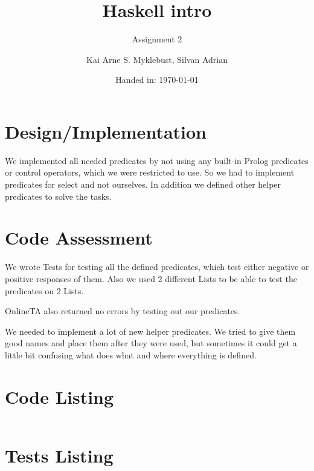 \documentclass[12pt,a4paper]{article}
\begin{document}
\title{Haskell intro}
\subtitle{Assignment 2}

\author{Kai Arne S. Myklebust, Silvan Adrian}
\date{Handed in: \today}
	
\maketitle
\tableofcontents

\section{Design/Implementation}

We implemented all needed predicates by not using any built-in Prolog predicates or control operators, which we were restricted to use.
So we had to implement predicates for select and not ourselves. In addition we defined other helper predicates to solve the tasks.

\section{Code Assessment}
We wrote Tests for testing all the defined predicates, which test either negative or positive responses of them.
Also we used 2 different Lists to be able to test the predicates on 2 Lists.

OnlineTA also returned no errors by testing out our predicates.

We needed to implement a lot of new helper predicates. We tried to give them good names and place them after they were used, but sometimes it could get a little bit confusing what does what and where everything is defined.

\appendix
\section{Code Listing}
\inputminted{prolog}{handin/twitbook.pl}

\section{Tests Listing}
\inputminted{prolog}{handin/tests.pl}
\end{document}
